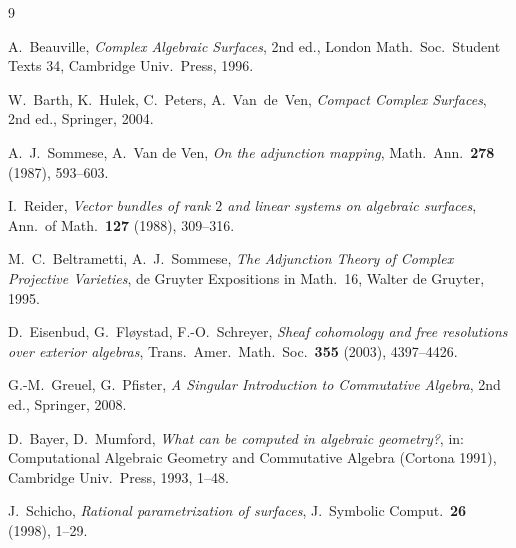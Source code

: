\documentclass{amsart}
\theoremstyle{plain}
\theoremstyle{definition}
\begin{document}
\begin{thebibliography}{9}

 A.~Beauville, \emph{Complex Algebraic Surfaces},
2nd ed., London Math.\ Soc.\ Student Texts 34, Cambridge Univ.\ Press, 1996.

 W.~Barth, K.~Hulek, C.~Peters, A.~Van~de~Ven,
\emph{Compact Complex Surfaces}, 2nd ed., Springer, 2004.

 A.~J.~Sommese, A.~Van de Ven, \emph{On the adjunction mapping},
Math.\ Ann.\ \textbf{278} (1987), 593--603.

 I.~Reider, \emph{Vector bundles of rank $2$ and linear systems
on algebraic surfaces}, Ann.\ of Math.\ \textbf{127} (1988), 309--316.

 M.~C.~Beltrametti, A.~J.~Sommese,
\emph{The Adjunction Theory of Complex Projective Varieties},
de Gruyter Expositions in Math.\ 16, Walter de Gruyter, 1995.

 D.~Eisenbud, G.~Fl\o ystad, F.-O.~Schreyer,
\emph{Sheaf cohomology and free resolutions over exterior algebras},
Trans.\ Amer.\ Math.\ Soc.\ \textbf{355} (2003), 4397--4426.

 G.-M.~Greuel, G.~Pfister,
\emph{A Singular Introduction to Commutative Algebra},
2nd ed., Springer, 2008.

 D.~Bayer, D.~Mumford, \emph{What can be computed in algebraic
geometry?}, in: Computational Algebraic Geometry and Commutative Algebra
(Cortona 1991), Cambridge Univ.\ Press, 1993, 1--48.

 J.~Schicho, \emph{Rational parametrization of surfaces},
J.\ Symbolic Comput.\ \textbf{26} (1998), 1--29.

\end{thebibliography}
\end{document}
